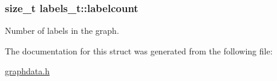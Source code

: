 \subsubsection[{\texorpdfstring{labelcount}{labelcount}}]{\setlength{\rightskip}{0pt plus 5cm}size\+\_\+t labels\+\_\+t\+::labelcount}\hypertarget{structlabels__t_af5b7ba7df24db052d4eb4d762a027039}{}\label{structlabels__t_af5b7ba7df24db052d4eb4d762a027039}
Number of labels in the graph. 

The documentation for this struct was generated from the following file\+:\begin{DoxyCompactItemize}
\item 
\hyperlink{graphdata_8h}{graphdata.\+h}\end{DoxyCompactItemize}
